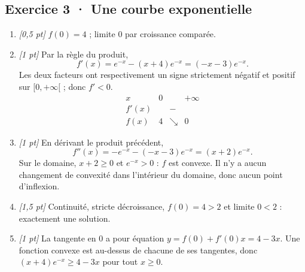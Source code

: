 \subsection*{Exercice 3 · Une courbe exponentielle}\begin{enumerate}

\item \textit{[0,5 pt]} $f(0)=4$ ; limite $0$ par croissance comparée.

\item \textit{[1 pt]} Par la règle du produit,
\[f'(x)=e^{-x}-(x+4)e^{-x}=(-x-3)e^{-x}.\]
Les deux facteurs ont respectivement un signe strictement négatif et positif sur $[0,+\infty[$ ; donc $f'<0$.
\[\begin{array}{c|ccc}x&0&&+\infty\\\hline f'(x)&&-&\\\hline f(x)&4&\searrow&0\end{array}\]

\item \textit{[1 pt]} En dérivant le produit précédent,
\[f''(x)=-e^{-x}-(-x-3)e^{-x}=(x+2)e^{-x}.\]
Sur le domaine, $x+2\ge0$ et $e^{-x}>0$ : $f$ est convexe. Il n'y a aucun changement de convexité dans l'intérieur du domaine, donc aucun point d'inflexion.

\item \textit{[1,5 pt]} Continuité, stricte décroissance, $f(0)=4>2$ et limite $0<2$ : exactement une solution.

\item \textit{[1 pt]} La tangente en $0$ a pour équation $y=f(0)+f'(0)x=4-3x$. Une fonction convexe est au-dessus de chacune de ses tangentes, donc $(x+4)e^{-x}\ge 4-3x$ pour tout $x\ge0$.

\end{enumerate}


